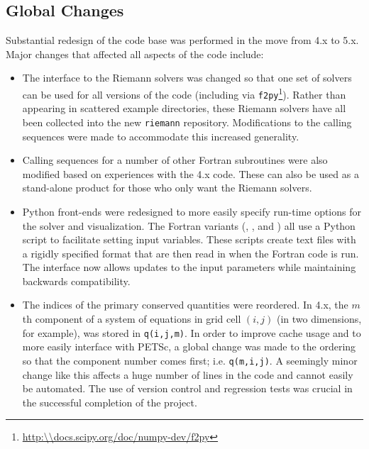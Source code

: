 %
%
%

\subsection{Global Changes}
Substantial redesign of the \clawpack code base was performed in the move
from \clawpack 4.x to 5.x.
Major changes that affected all aspects of the code include:
\begin{itemize}
    \item The interface to the \clawpack Riemann solvers was changed so that one
    set of solvers can be used for all versions of the code (including \pyclaw
    via
    \texttt{f2py}\footnote{\url{http:\\docs.scipy.org/doc/numpy-dev/f2py}}).
    Rather than appearing in scattered example directories,
    these Riemann solvers have all been collected into the new
    \texttt{riemann} repository. Modifications to the
    calling sequences were made to accommodate this increased generality.
    \item Calling sequences for a number of other Fortran subroutines were also
    modified based on experiences with the \clawpack 4.x code.  These can also
    be used as a stand-alone product for those who only want the Riemann
    solvers.
    \item Python front-ends were redesigned to more easily
    specify run-time options for
    the solver and visualization.  The Fortran variants (\classic, \amrclaw, and
    \geoclaw) all use a Python script to facilitate setting input variables.
    These scripts create text files with a rigidly specified format that are then read
    in when the Fortran code is run. The interface now allows updates to the
    input parameters while maintaining backwards compatibility.
    \item The indices of the primary conserved quantities were reordered.  In
    \clawpack 4.x, the $m$th component of a
    system of equations in grid cell $(i,j)$ (in two dimensions, for example),
    was stored in \texttt{q(i,j,m)}.  In order to improve cache usage and to
    more easily interface with PETSc, a global
    change was made to the ordering so that the component number comes
    first; i.e. \texttt{q(m,i,j)}.  A seemingly minor change like this affects a
    huge number of lines in the code and cannot easily be automated. The use of
    version control and regression tests was crucial in the successful
    completion of the project. 
\end{itemize}
